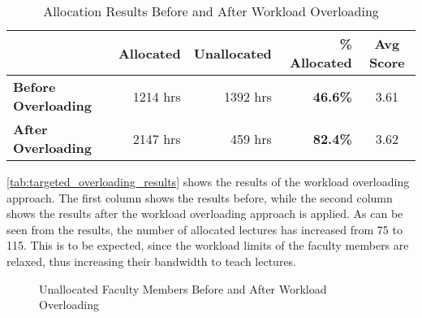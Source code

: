 \begin{table}[H]
  \centering
  \begin{tabular}{|l|r|r|r|c|}
    \hline
    \textbf{}                   & \textbf{Allocated} & \textbf{Unallocated} & \textbf{\% Allocated} & \textbf{Avg Score} \\ \hline
    \textbf{Before Overloading} & 1214  hrs          & 1392  hrs            & \textbf{46.6\%}       & 3.61               \\
    \textbf{After Overloading}  & 2147  hrs          & 459  hrs             & \textbf{82.4\%}       & 3.62               \\
    \hline
  \end{tabular}
  \caption{Allocation Results Before and After Workload Overloading}
  \label{tab:targeted_overloading_results}
\end{table}

\autoref{tab:targeted_overloading_results} shows the results of the workload overloading approach. The first column shows the results before, while the second column shows the results after the workload overloading approach is applied. As can be seen from the results, the number of allocated lectures has increased from 75 to 115. This is to be expected, since the workload limits of the faculty members are relaxed, thus increasing their bandwidth to teach lectures.


\begin{figure}[H]
  \centering

  \caption{Unallocated Faculty Members Before and After Workload Overloading}
  \label{fig:faculty_utilization_workload_overloading}
\end{figure}

